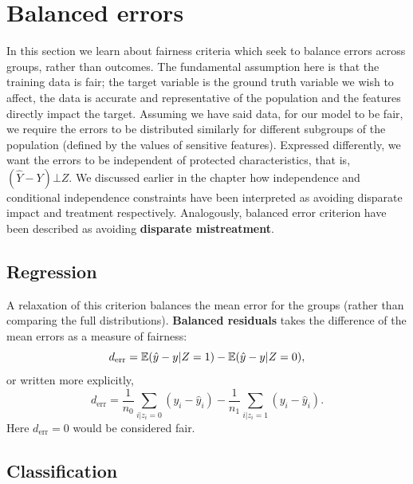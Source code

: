 \section{Balanced errors} \label{sec_BalErr}

In this section we learn about fairness criteria which seek to balance errors across groups, rather than outcomes. The fundamental assumption here is that the training data is fair; the target variable is the ground truth variable we wish to affect, the data is accurate and representative of the population and the features directly impact the target. Assuming we have said data, for our model to be fair, we require the errors to be distributed similarly for different subgroups of the population (defined by the values of sensitive features). Expressed differently, we want the errors to be independent of protected characteristics, that is, $(\hat{Y}-Y) \bot Z$. We discussed earlier in the chapter how independence and conditional independence constraints have been interpreted as avoiding disparate impact and treatment respectively. Analogously, balanced error criterion have been described as avoiding \textbf{disparate mistreatment}\cite{DispMistreat}.

\subsection{Regression}

A relaxation of this criterion balances the mean error for the groups (rather than comparing the full distributions). \textbf{Balanced residuals}\cite{BalRes} takes the difference of the mean errors as a measure of fairness:
\[
d_{\text{err}} = \mathbb{E}(\hat{y} - y | Z=1) - \mathbb{E}(\hat{y} - y | Z=0),
\]
or written more explicitly,
\[
d_{\text{err}} = \frac{1}{n_0}\sum_{i|z_i=0}(y_i-\hat{y}_i)
               - \frac{1}{n_1}\sum_{i|z_i=1}(y_i-\hat{y}_i).
\]
Here $d_{\text{err}}=0$ would be considered fair.

\subsection{Classification}

